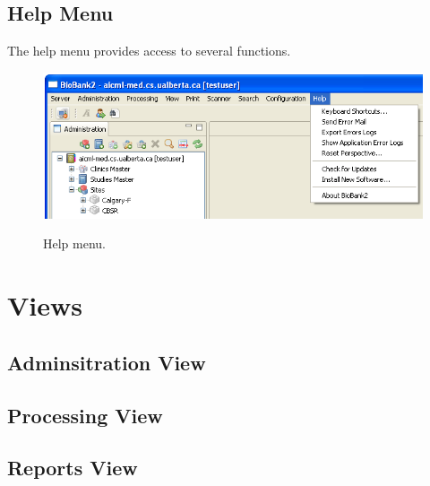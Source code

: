 \subsection{Help Menu}
The help menu provides access to several functions.
    \begin{figure}[H]
      \centering
      \scalebox{0.5}
      { \includegraphics*{screenshots/overview/main_menu_help} }
      \caption{Help menu.}
      \label{fig:main_menu_help}
    \end{figure}

\section{Views}
\label{sec:application_views}

\subsection{Adminsitration View}

\subsection{Processing View}

\subsection{Reports View}
